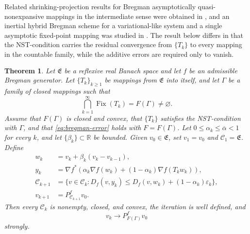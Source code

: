 \documentclass[leqno,12pt]{amsart}
\def\R{\mathbb{R}}
\newtheorem{theorem}{Theorem}[section]
\theoremstyle{definition}
\theoremstyle{remark}
\numberwithin{equation}{section}
\newcommand{\E}{\mathfrak{E}}
\newcommand{\C}{\mathscr{C}}
\newcommand{\Fix}{\operatorname{Fix}}
\begin{document}
Related shrinking-projection results for Bregman asymptotically
quasi-nonexpansive mappings in the intermediate sense were obtained in
\cite{Tomizawa2014}, and an inertial hybrid Bregman scheme for a
variational-like system and a single asymptotic fixed-point mapping was studied
in \cite{AlNemerAliFarid2025}.  The result below differs in that the NST-condition carries the residual convergence from $\{T_k\}$ to every mapping in the countable family, while the additive errors are required only to vanish.

\begin{theorem}\label{thm:bregman}
Let $\E$ be a reflexive real Banach space and let $f$ be an admissible Bregman generator. Let $\{T_k\}_{k\geq1}$ be mappings from $\E$ into itself, and let $\Gamma$ be a family of closed mappings such that
\[
 \bigcap_{k=1}^{\infty}\Fix(T_k)=F(\Gamma)\neq\varnothing.
\]
Assume that $F(\Gamma)$ is closed and convex, that $\{T_k\}$ satisfies the NST-condition with $\Gamma$, and that \eqref{eq:bregman-error} holds with $F=F(\Gamma)$. Let $0\leq\alpha_k\leq\overline\alpha<1$ for every $k$, and let $\{\beta_k\}\subset\R$ be bounded. Given $v_0\in\E$, set $v_1=v_0$ and $\C_1=\E$. Define
\begin{equation}\label{eq:bregman-algorithm}
\begin{aligned}
 w_k&=v_k+\beta_k(v_k-v_{k-1}),\\
 y_k&=\nabla f^*\!\left(\alpha_k\nabla f(w_k)
 +(1-\alpha_k)\nabla f(T_kw_k)\right),\\
 \C_{k+1}
 &=\bigl\{v\in\C_k:
 D_f(v,y_k)\leq D_f(v,w_k)+(1-\alpha_k)\varepsilon_k\bigr\},\\
 v_{k+1}&=P_{\C_{k+1}}^f v_0.
\end{aligned}
\end{equation}
Then every $\C_k$ is nonempty, closed, and convex, the iteration is well defined, and
\[
 v_k\longrightarrow P_{F(\Gamma)}^f v_0
\]
strongly.
\end{theorem}
\end{document}
